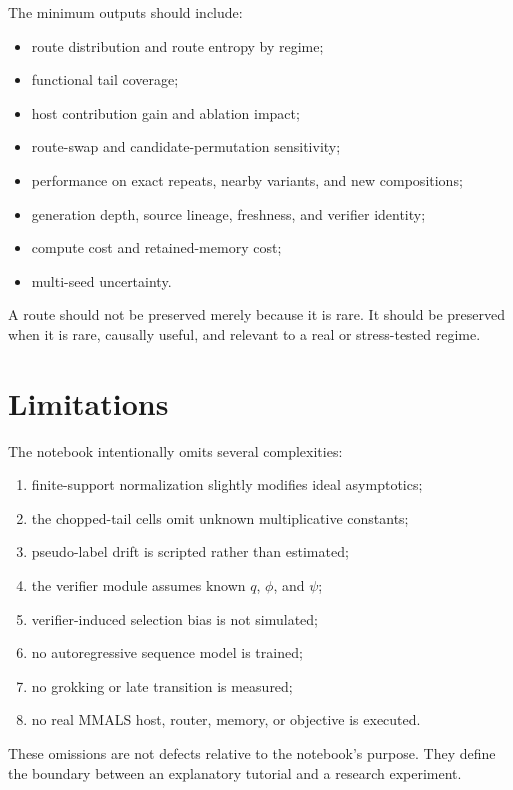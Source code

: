 \documentclass[10pt]{article}
\begin{document}
The minimum outputs should include:
\begin{itemize}[leftmargin=*]
  \item route distribution and route entropy by regime;
  \item functional tail coverage;
  \item host contribution gain and ablation impact;
  \item route-swap and candidate-permutation sensitivity;
  \item performance on exact repeats, nearby variants, and new compositions;
  \item generation depth, source lineage, freshness, and verifier identity;
  \item compute cost and retained-memory cost;
  \item multi-seed uncertainty.
\end{itemize}

A route should not be preserved merely because it is rare. It should be preserved when it is rare, causally useful, and relevant to a real or stress-tested regime.

\section{Limitations}

The notebook intentionally omits several complexities:
\begin{enumerate}[leftmargin=*]
  \item finite-support normalization slightly modifies ideal asymptotics;
  \item the chopped-tail cells omit unknown multiplicative constants;
  \item pseudo-label drift is scripted rather than estimated;
  \item the verifier module assumes known $q$, $\phi$, and $\psi$;
  \item verifier-induced selection bias is not simulated;
  \item no autoregressive sequence model is trained;
  \item no grokking or late transition is measured;
  \item no real MMALS host, router, memory, or objective is executed.
\end{enumerate}

These omissions are not defects relative to the notebook's purpose. They define the boundary between an explanatory tutorial and a research experiment.
\end{document}
